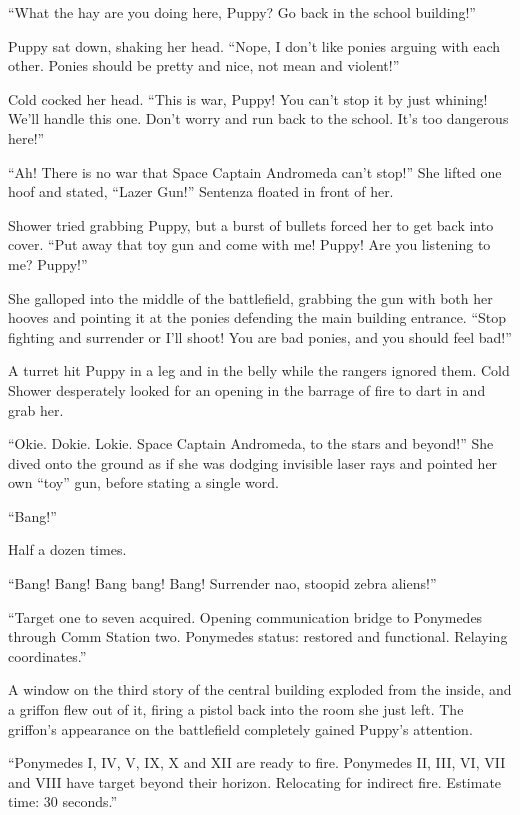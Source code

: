 ``What the hay are you doing here, Puppy? Go back in the school building!''

Puppy sat down, shaking her head. ``Nope, I don't like ponies arguing with each other. Ponies should be pretty and nice, not mean and violent!''

Cold cocked her head. ``This is war, Puppy! You can't stop it by just whining! We'll handle this one. Don't worry and run back to the school. It's too dangerous here!''

``Ah! There is no war that Space Captain Andromeda can't stop!'' She lifted one hoof and stated, ``Lazer Gun!'' Sentenza floated in front of her.

Shower tried grabbing Puppy, but a burst of bullets forced her to get back into cover. ``Put away that toy gun and come with me! Puppy! Are you listening to me? Puppy!''

She galloped into the middle of the battlefield, grabbing the gun with both her hooves and pointing it at the ponies defending the main building entrance. ``Stop fighting and surrender or I'll shoot! You are bad ponies, and you should feel bad!''

A turret hit Puppy in a leg and in the belly while the rangers ignored them. Cold Shower desperately looked for an opening in the barrage of fire to dart in and grab her.

``Okie. Dokie. Lokie. Space Captain Andromeda, to the stars and beyond!'' She dived onto the ground as if she was dodging invisible laser rays and pointed her own ``toy'' gun, before stating a single word.

``Bang!''

Half a dozen times.

``Bang! Bang! Bang bang! Bang! Surrender nao, stoopid zebra aliens!''

{\mt ``Target one to seven acquired. Opening communication bridge to Ponymedes through Comm Station two. Ponymedes status: restored and functional. Relaying coordinates.''}

A window on the third story of the central building exploded from the inside, and a griffon flew out of it, firing a pistol back into the room she just left. The griffon's appearance on the battlefield completely gained Puppy's attention.

{\mt ``Ponymedes I, IV, V, IX, X and XII are ready to fire. Ponymedes II, III, VI, VII and VIII have target beyond their horizon. Relocating for indirect fire. Estimate time: 30 seconds.''}

